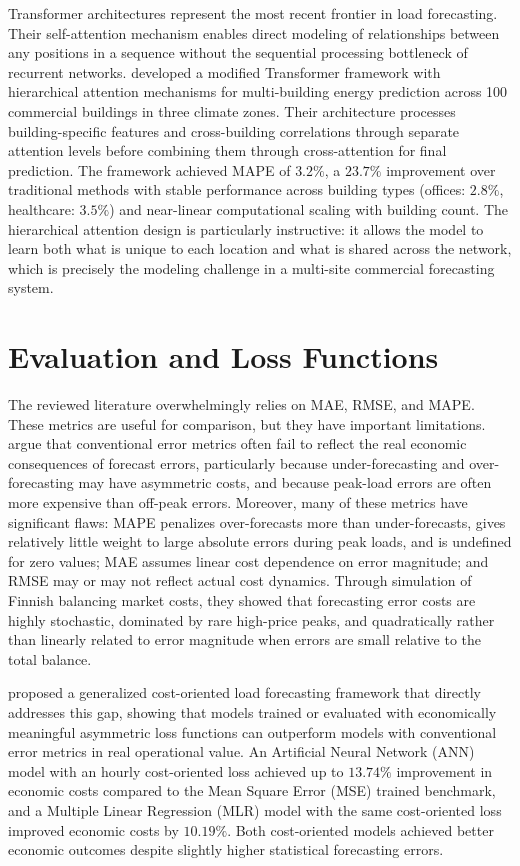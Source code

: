 Transformer architectures represent the most recent frontier in load forecasting. Their
self-attention mechanism enables direct modeling of relationships between any positions
in a sequence without the sequential processing bottleneck of recurrent networks.
\citet{moveh2025a} developed a modified Transformer framework with hierarchical attention
mechanisms for multi-building energy prediction across 100 commercial buildings in three
climate zones. Their architecture processes building-specific features and cross-building
correlations through separate attention levels before combining them through cross-attention
for final prediction. The framework achieved MAPE of $3.2\%$, a $23.7\%$ improvement
over traditional methods with stable performance across building types (offices:
$2.8\%$, healthcare: $3.5\%$) and near-linear computational scaling with building count.
The hierarchical attention design is particularly instructive: it allows the model to
learn both what is unique to each location and what is shared across the network, which
is precisely the modeling challenge in a multi-site commercial forecasting system.

\section{Evaluation and Loss Functions}

The reviewed literature overwhelmingly relies on MAE, RMSE, and MAPE. These metrics are
useful for comparison, but they have important limitations. \citet{koponen2020} argue that
conventional error metrics often fail to reflect the real economic consequences of forecast
errors, particularly because under-forecasting and over-forecasting may have asymmetric
costs, and because peak-load errors are often more expensive than off-peak errors. Moreover,
many of these metrics have significant flaws: MAPE penalizes over-forecasts more than
under-forecasts, gives relatively little weight to large absolute errors during peak loads,
and is undefined for zero values; MAE assumes linear cost dependence on error magnitude;
and RMSE may or may not reflect actual cost dynamics. Through simulation of Finnish
balancing market costs, they showed that forecasting error costs are highly stochastic,
dominated by rare high-price peaks, and quadratically rather than linearly related to
error magnitude when errors are small relative to the total balance.

\citet{zhang2021} proposed a generalized cost-oriented load forecasting framework that
directly addresses this gap, showing that models trained or evaluated with economically
meaningful asymmetric loss functions can outperform models with conventional error metrics
in real operational value. An Artificial Neural Network (ANN) model with an hourly cost-oriented loss achieved up to
$13.74\%$ improvement in economic costs compared to the Mean Square Error (MSE) trained benchmark, and a Multiple Linear Regression
(MLR) model with the same cost-oriented loss improved economic costs by $10.19\%$. Both
cost-oriented models achieved better economic outcomes despite slightly higher statistical
forecasting errors.

